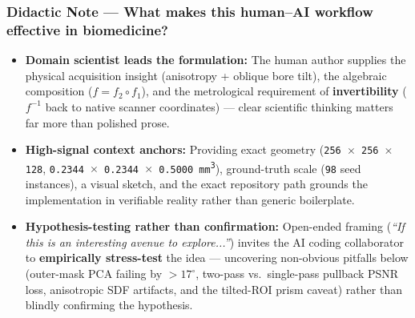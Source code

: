 \documentclass[10pt,a4paper]{article}
\renewcommand{\_}{\origunderscore\allowbreak}
\begin{document}
\subsubsection*{Didactic Note --- What makes this human--AI workflow effective in biomedicine?}
\begin{itemize}[itemsep=1.5pt, topsep=2pt]
    \item \textbf{Domain scientist leads the formulation:} The human author supplies the physical acquisition insight (anisotropy + oblique bore tilt), the algebraic composition ($f = f_2 \circ f_1$), and the metrological requirement of \textbf{invertibility} ($f^{-1}$ back to native scanner coordinates) --- clear scientific thinking matters far more than polished prose.
    \item \textbf{High-signal context anchors:} Providing exact geometry (\texttt{256 $\times$ 256 $\times$ 128}, \texttt{0.2344 $\times$ 0.2344 $\times$ 0.5000 mm\textsuperscript{3}}), ground-truth scale (\texttt{98} seed instances), a visual sketch, and the exact repository path grounds the implementation in verifiable reality rather than generic boilerplate.
    \item \textbf{Hypothesis-testing rather than confirmation:} Open-ended framing (\textit{``If this is an interesting avenue to explore...''}) invites the AI coding collaborator to \textbf{empirically stress-test} the idea --- uncovering non-obvious pitfalls below (outer-mask PCA failing by $>17^\circ$, two-pass vs.\ single-pass pullback PSNR loss, anisotropic SDF artifacts, and the tilted-ROI prism caveat) rather than blindly confirming the hypothesis.
\end{itemize}
\end{document}
